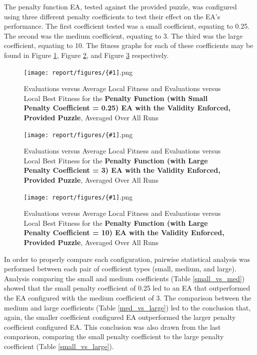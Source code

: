\documentclass[11pt]{article}
\newcommand{\fitnessplotcaption}[1]{\caption{Evaluations versus Average Local Fitness and Evaluations versus 
    Local Best Fitness for the \textbf{{#1}}, Averaged Over All Runs}}
\newcommand{\addgraphic}[1]{\centerline{\texttt{[image: report/figures/\{\#1]}.png}}}
\begin{document}
The penalty function EA, tested against the provided puzzle, was configured using three different penalty coefficients
to test their effect on the EA's performance. The first coefficient tested was a small coefficient, equating to 0.25. The
second was the medium coefficient, equating to 3. The third was the large coefficient, equating to 10. The fitness graphs for
each of these coefficients may be found in Figure \ref{fig:website_puzzle_validity_enforced_small_penalty_graph},
Figure \ref{fig:website_puzzle_validity_enforced_med_penalty_graph}, and Figure 
\ref{fig:website_puzzle_validity_enforced_large_penalty_graph} respectively.

\begin{figure}[H]
    \addgraphic{website_puzzle_validity_enforced_small_penalty_graph}
    \fitnessplotcaption{Penalty Function (with Small Penalty Coefficient = 0.25) EA with the Validity Enforced, Provided Puzzle}
    \label{fig:website_puzzle_validity_enforced_small_penalty_graph}
\end{figure}

\begin{figure}[H]
    \addgraphic{website_puzzle_validity_enforced_graph}
    \fitnessplotcaption{Penalty Function (with Large Penalty Coefficient = 3) EA with the Validity Enforced, Provided Puzzle}
    \label{fig:website_puzzle_validity_enforced_med_penalty_graph}
\end{figure}

\begin{figure}[H]
    \addgraphic{website_puzzle_validity_enforced_large_penalty_graph}
    \fitnessplotcaption{Penalty Function (with Large Penalty Coefficient = 10) EA with the Validity Enforced, Provided Puzzle}
    \label{fig:website_puzzle_validity_enforced_large_penalty_graph}
\end{figure}


In order to properly compare each configuration, pairwise statistical analysis was performed between each pair of coefficient types
(small, medium, and large). Analysis comparing the small and medium coefficients (Table \ref{small_vs_med}) showed that the small
penalty coefficient of 0.25 led to an EA that outperformed the EA configured with the medium coefficient of 3. The comparison between
the medium and large coefficients (Table \ref{med_vs_large}) led to the conclusion that, again, the smaller coefficient configured EA 
outperformed the larger penalty coefficient configured EA. This conclusion was also drawn from the last comparison, comparing the small
penalty coefficient to the large penalty coefficient (Table \ref{small_vs_large}).
\end{document}
